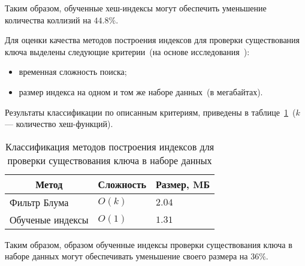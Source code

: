 Таким образом, обученные хеш-индексы могут обеспечить уменьшение количества
коллизий на $44.8\%$.

Для оценки качества методов построения индексов для проверки существования ключа
выделены следующие критерии~(на основе исследования~\cite{main}):
\begin{itemize}
    \item временная сложность поиска;
    \item размер индекса на одном и том же наборе данных~(в мегабайтах).
\end{itemize}

Результаты классификации по описанным критериям, приведены в
таблице~\ref{tab:03}~($k$ --- количество хеш-функций).

{
\captionsetup{format=hang,justification=raggedleft,
              singlelinecheck=off,width=12cm}
\begin{longtable}[Hc]{|p{5.3cm}|p{2cm}|p{2cm}|}
\caption{Классификация методов построения индексов для проверки существования
ключа в наборе данных\label{tab:03}}\\
    \hline
    \multicolumn{1}{|c|}{\textbf{Метод}} &
    \multicolumn{1}{c|}{\textbf{Сложность}} &
    \multicolumn{1}{c|}{\textbf{Размер, MБ}}\\
    \hline
    Фильтр Блума
    & $O(k)$
    & $2.04$\\
    \hline
    Обученые индексы
    & $O(1)$
    & $1.31$\\
    \hline
\end{longtable}
}

Таким образом, образом обученные индексы проверки существования ключа в наборе
данных могут обеспечивать уменьшение своего размера на $36\%$.

